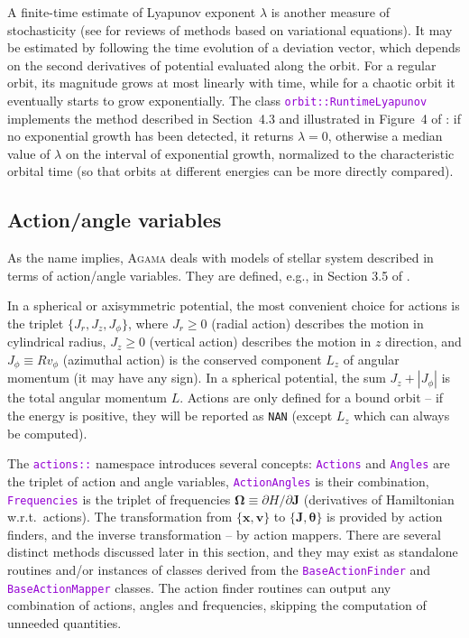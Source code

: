\documentclass[12pt]{article}
\newcommand{\Agama}{\textsc{Agama}\xspace}
\newcommand{\ttt}[1]{\textcolor{darkviolet}{\texttt{#1}}}
\newcommand{\D}{\partial}
\newcommand{\bv}{\boldsymbol{v}}
\newcommand{\bx}{\boldsymbol{x}}
\newcommand{\bJ}{\boldsymbol{J}}
\newcommand{\bt}{\boldsymbol{\theta}}
\begin{document}
A finite-time estimate of Lyapunov exponent $\lambda$ is another measure of stochasticity (see \cite{Carpintero2014, Skokos2010} for reviews of methods based on variational equations). It may be estimated by following the time evolution of a deviation vector, which depends on the second derivatives of potential evaluated along the orbit. For a regular orbit, its magnitude grows at most linearly with time, while for a chaotic orbit it eventually starts to grow exponentially. The class \ttt{orbit::RuntimeLyapunov} implements the method described in Section~4.3 and illustrated in Figure~4 of \cite{Vasiliev2013}: if no exponential growth has been detected, it returns $\lambda=0$, otherwise a median value of $\lambda$ on the interval of exponential growth, normalized to the characteristic orbital time (so that orbits at different energies can be more directly compared).


\subsection{Action/angle variables}  \label{sec:ActionAngle}

As the name implies, \Agama deals with models of stellar system described in terms of action/angle variables. They are defined, e.g., in Section 3.5 of \cite{BinneyTremaine}.

In a spherical or axisymmetric potential, the most convenient choice for actions is the triplet $\{J_r, J_z, J_\phi\}$, where $J_r\ge 0$ (radial action) describes the motion in cylindrical radius, $J_z\ge 0$ (vertical action) describes the motion in $z$ direction, and $J_\phi \equiv R v_\phi$ (azimuthal action) is the conserved component $L_z$ of angular momentum (it may have any sign). In a spherical potential, the sum $J_z + |J_\phi|$ is the total angular momentum $L$. Actions are only defined for a bound orbit -- if the energy is positive, they will be reported as \texttt{NAN} (except $L_z$ which can always be computed).

The \ttt{actions::} namespace introduces several concepts: \ttt{Actions} and \ttt{Angles} are the triplet of action and angle variables, \ttt{ActionAngles} is their combination, \ttt{Frequencies} is the triplet of frequencies $\boldsymbol{\Omega}\equiv \D H/\D \bJ$ (derivatives of Hamiltonian w.r.t.\ actions). 
The transformation from $\{\bx,\bv\}$ to $\{\bJ,\bt\}$ is provided by action finders, and the inverse transformation -- by action mappers. There are several distinct methods discussed later in this section, and they may exist as standalone routines and/or instances of classes derived from the \ttt{BaseActionFinder} and \ttt{BaseActionMapper} classes. The action finder routines can output any combination of actions, angles and frequencies, skipping the computation of unneeded quantities.
\end{document}
